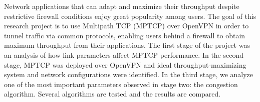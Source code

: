 Network applications that can adapt and maximize their throughput despite restrictive firewall conditions enjoy great popularity among users. The goal of this research project is to use Multipath TCP (MPTCP) over OpenVPN in order to tunnel traffic via common protocols, enabling users behind a firewall to obtain maximum throughput from their applications. The first stage of the project was an analysis of how link parameters affect MPTCP performance. In the second stage, MPTCP was deployed over OpenVPN and ideal throughput-maximizing system and network configurations were identified. In the third stage, we analyze one of the most important parameters observed in stage two: the congestion algorithm. Several algorithms are tested and the results are compared.